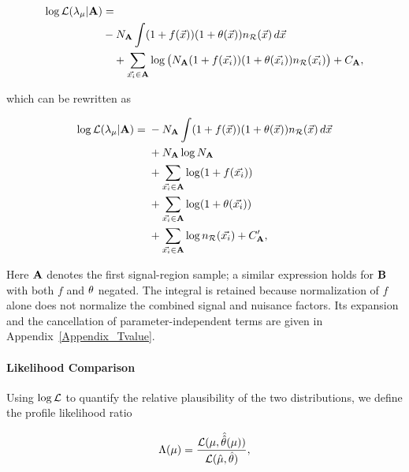 \documentclass[paper/ddppaper2.tex]{subfiles}
\begin{document}
\begin{wideequations}
\begin{equation}
\begin{aligned}
    \llikelihood( \lambda_\param | \dataset{A}) &={}\\
    & -N_{\dataset{A}}\int (1+f(\anyevent))(1+\nparam(\anyevent))\refdist\,d\anyevent\\
    &\quad + \sum_{\event \in \dataset{A}} \log\big({N}_{\dataset{A}} (1 + f(\event)) (1 + \nparam(\event)) \refdist[\event]\big) + C_\dataset{A},
\end{aligned}
\end{equation}

\noindent which can be rewritten as

\begin{equation}
\label{eq:log_likelihood_of_a_learnable_distribution}
\begin{aligned}
    \llikelihood( \lambda_\param | \dataset{A}) ={}&
    -N_{\dataset{A}}\int (1+f(\anyevent))(1+\nparam(\anyevent))\refdist\,d\anyevent
    \\& + N_{\dataset{A}}\log{N_{\dataset{A}}}
    \\& + \sum_{\event \in \dataset{A}} \log(1 + f(\event)) \\&
    + \sum_{\event \in \dataset{A}} \log(1 + \nparam(\event))
    \\& + \sum_{\event \in \dataset{A}} \log \refdist[\event]
    + C'_\dataset{A},
\end{aligned}
\end{equation}

\noindent Here $\dataset{A}$ denotes the first signal-region sample; a similar
expression holds for $\dataset{B}$ with both $f$ and $\nparam$ negated.
The integral is retained because normalization of $f$ alone does not
normalize the combined signal and nuisance factors. Its expansion and
the cancellation of parameter-independent terms are given in
Appendix~\ref{Appendix_Tvalue}.

\end{wideequations}

\paragraph{Likelihood Comparison}

Using $\llikelihood$ to quantify the relative plausibility of the two distributions, we define the profile likelihood ratio

\begin{equation}
\label{eq:profile_likelihood_ratio}
\plratio = \dfrac{\likelihood(\param, \hat{\hat{\nparam}}(\param))}{\likelihood(\hat{\param}, \hat{\nparam})},
\end{equation}
\end{document}
